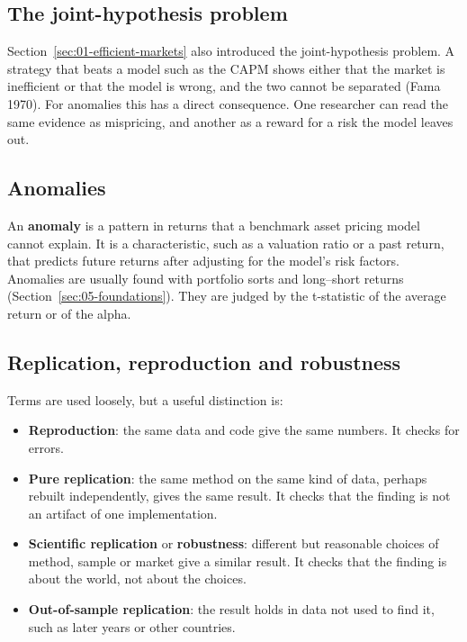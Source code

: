 \subsection{The joint-hypothesis problem}

Section~\ref{sec:01-efficient-markets} also introduced the joint-hypothesis problem. A strategy that beats a model such as the CAPM shows either that the market is inefficient or that the model is wrong, and the two cannot be separated (Fama 1970). For anomalies this has a direct consequence. One researcher can read the same evidence as mispricing, and another as a reward for a risk the model leaves out.

\subsection{Anomalies}

An \textbf{anomaly} is a pattern in returns that a benchmark asset pricing model cannot explain. It is a characteristic, such as a valuation ratio or a past return, that predicts future returns after adjusting for the model's risk factors. Anomalies are usually found with portfolio sorts and long--short returns (Section~\ref{sec:05-foundations}). They are judged by the t-statistic of the average return or of the alpha.

\subsection{Replication, reproduction and robustness}

Terms are used loosely, but a useful distinction is:

\begin{itemize}
  \item \textbf{Reproduction}: the same data and code give the same numbers. It checks for errors.
  \item \textbf{Pure replication}: the same method on the same kind of data, perhaps rebuilt independently, gives the same result. It checks that the finding is not an artifact of one implementation.
  \item \textbf{Scientific replication} or \textbf{robustness}: different but reasonable choices of method, sample or market give a similar result. It checks that the finding is about the world, not about the choices.
  \item \textbf{Out-of-sample replication}: the result holds in data not used to find it, such as later years or other countries.
\end{itemize}

